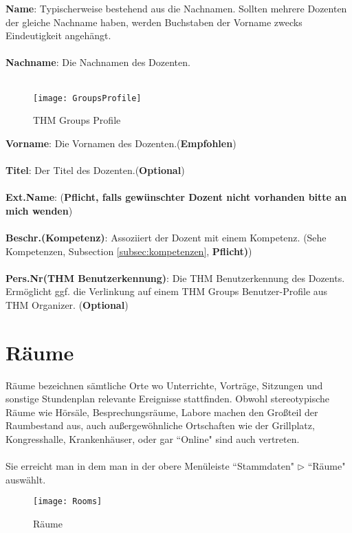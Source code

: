 \noindent
\textbf{Name}: Typischerweise bestehend aus die Nachnamen. Sollten mehrere Dozenten der gleiche Nachname haben, werden Buchstaben der Vorname zwecks Eindeutigkeit angehängt. \\
\\
\textbf{Nachname}: Die Nachnamen des Dozenten.\\
\\
\begin{wrapfigure}{r}{0.4\textwidth}
	\vspace{-10pt}
	\texttt{[image: GroupsProfile]}
	\vspace{-5pt}
	\caption{THM Groups Profile}
	\label{fig:thmgroupsprofile}
\end{wrapfigure}
\textbf{Vorname}: Die Vornamen des Dozenten.(\textbf{Empfohlen})\\
\\
\textbf{Titel}: Der Titel des Dozenten.(\textbf{Optional})\\
\\
\textbf{Ext.Name}: (\textbf{Pflicht, falls gewünschter Dozent nicht vorhanden bitte an mich wenden})\\
\\
\textbf{Beschr.(Kompetenz)}: Assoziiert der Dozent mit einem Kompetenz. (Sehe Kompetenzen, Subsection  \ref{subsec:kompetenzen}, \textbf{Pflicht)})\\
\\
\textbf{Pers.Nr(THM Benutzerkennung)}: Die THM Benutzerkennung des Dozents. Ermöglicht ggf. die Verlinkung auf einem THM Groups Benutzer-Profile aus THM Organizer. (\textbf{Optional})\\

\newpage
\section{Räume}

Räume bezeichnen sämtliche Orte wo Unterrichte, Vorträge, Sitzungen und sonstige Stundenplan relevante Ereignisse stattfinden. Obwohl stereotypische Räume wie Hörsäle, Besprechungsräume, Labore machen den Großteil der Raumbestand aus, auch außergewöhnliche Ortschaften wie der Grillplatz, Kongresshalle, Krankenhäuser, oder gar ``Online" sind auch vertreten.\\
\\
Sie erreicht man in dem man in der obere Menüleiste ``Stammdaten" $\triangleright$ ``Räume" auswählt.

\begin{figure}[h]
	\texttt{[image: Rooms]}
	\vspace{-15pt}
	\caption{Räume}
	\label{fig:rooms}
\end{figure}

